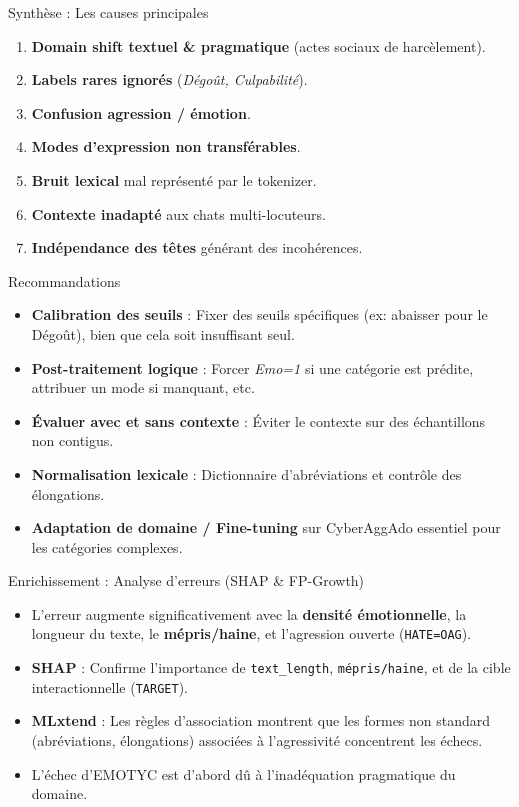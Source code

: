 \documentclass{beamer}
\begin{document}
\begin{frame}{Synthèse : Les causes principales}
    \begin{enumerate}
        \item \textbf{Domain shift textuel \& pragmatique} (actes sociaux de harcèlement).
        \item \textbf{Labels rares ignorés} (\textit{Dégoût, Culpabilité}).
        \item \textbf{Confusion agression / émotion}.
        \item \textbf{Modes d'expression non transférables}.
        \item \textbf{Bruit lexical} mal représenté par le tokenizer.
        \item \textbf{Contexte inadapté} aux chats multi-locuteurs.
        \item \textbf{Indépendance des têtes} générant des incohérences.
    \end{enumerate}
\end{frame}

\begin{frame}{Recommandations}
    \begin{itemize}
        \item \textbf{Calibration des seuils} : Fixer des seuils spécifiques (ex: abaisser pour le Dégoût), bien que cela soit insuffisant seul.
        \item \textbf{Post-traitement logique} : Forcer \textit{Emo=1} si une catégorie est prédite, attribuer un mode si manquant, etc.
        \item \textbf{Évaluer avec et sans contexte} : Éviter le contexte sur des échantillons non contigus.
        \item \textbf{Normalisation lexicale} : Dictionnaire d'abréviations et contrôle des élongations.
        \item \textbf{Adaptation de domaine / Fine-tuning} sur CyberAggAdo essentiel pour les catégories complexes.
    \end{itemize}
\end{frame}

\begin{frame}{Enrichissement : Analyse d'erreurs (SHAP \& FP-Growth)}
    \begin{itemize}
        \item L'erreur augmente significativement avec la \textbf{densité émotionnelle}, la longueur du texte, le \textbf{mépris/haine}, et l'agression ouverte (\texttt{HATE=OAG}).
        \item \textbf{SHAP} : Confirme l'importance de \texttt{text\_length}, \texttt{mépris/haine}, et de la cible interactionnelle (\texttt{TARGET}).
        \item \textbf{MLxtend} : Les règles d'association montrent que les formes non standard (abréviations, élongations) associées à l'agressivité concentrent les échecs.
        \item L'échec d'EMOTYC est d'abord dû à l'inadéquation pragmatique du domaine.
    \end{itemize}
\end{frame}
\end{document}
